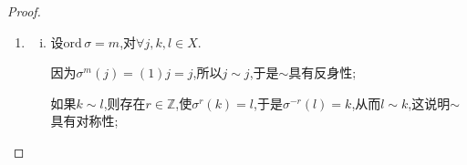 \documentclass[../../main.tex]{subfiles}%
\begin{document}
\begin{proof}
\begin{enumerate}[(1)]
若$a \neq \sigma_1$，则$\bar{F}_{\sigma_1^{-1} a} \neq \bar{F}_{\text{id}}= \varnothing$. 从而$\bar{F}_{\sigma_1^{-1} a} \neq \bar{F}_{a}$,否则由\eqref{eq:::09gjhy45he4t2fbety4swygew3tygwef23g2.5.5}式知$\bar{F}_{\sigma _1}=\varnothing $,即$\sigma_1=\text{id}$,这与$i_1,i_2,\cdots,i_{r-1}$互不相同矛盾!
再对$\sigma_1^{-1} a$用上述方法同理可得另一轮换$\sigma_2=(j_1j_2\cdots j_{l-1})$,使得
\begin{align}
\bar{F}_{\sigma _2}=\{j_1,j_2,\cdots, j_{l-1}\}\subseteq \bar{F}_{\sigma _{1}^{-1}a},\label{eq::9h2344ttf3g4w5yehbyjkym}
\end{align}
并且
\begin{align*}
\begin{cases}
\bar{F}_{\sigma _{1}^{-1}a}=\bar{F}_{\sigma _2}\cup \bar{F}_{\sigma _{2}^{-1}\sigma _{1}^{-1}a},\\
\bar{F}_{\sigma _2}\cap \bar{F}_{\sigma _{2}^{-1}\sigma _{1}^{-1}a}=\varnothing .\\
\end{cases}
\end{align*}
若$a\ne \sigma_1\sigma_2$,则同理有$\bar{F}_{\sigma_2^{-1} \sigma_1^{-1} a} \neq \bar{F}_{\sigma_1^{-1} a}$.
从而$\bar{F}_{\sigma_2^{-1} \sigma_1^{-1} a} \subset \bar{F}_{\sigma_1^{-1} a} \subset \bar{F}_a$. 由\eqref{eq:::09gjhy45he4t2fbety4swygew3tygwef23g2.5.5}式和\eqref{eq::9h2344ttf3g4w5yehbyjkym}式知$$\{i_1, i_2, \cdots, i_{r-1}\}\cap \{j_1,j_2,\cdots, j_{l-1}\}=\bar{F}_{\sigma_1}\cap \bar{F}_{\sigma _2}=\varnothing,$$
故$\sigma_1$与$\sigma_2$为不相交的轮换.
继续做下去.由于$\bar{F}_a$是有限的，最后有$s\in \mathbb{N}$,使得互不相交的轮换$\sigma_1,\sigma_2,\cdots,\sigma_s$满足
\begin{align*}
\bar{F}_{\sigma_s^{-1} \sigma_{s-1}^{-1} \cdots \sigma_1^{-1} a} = \varnothing,
\end{align*}
即$\sigma_s^{-1} \sigma_{s-1}^{-1} \cdots \sigma_1^{-1} a = \text{id}$，因而
\begin{align*}
a = \sigma_1 \sigma_2 \cdots \sigma_s,
\end{align*}
即$S_n$中任何元素可表为互不相交的轮换之积.

\item \begin{enumerate}[(i)]
\item 设$\text{ord}\,\sigma = m$,对$\forall j,k,l \in X$.

因为$\sigma^m(j) = (1)j = j$,所以$j \sim j$,于是$\sim$具有反身性;

如果$k \sim l$,则存在$r \in \mathbb{Z}$,使$\sigma^r(k) = l$,于是$\sigma^{-r}(l) = k$,从而$l \sim k$,这说明$\sim$具有对称性;


\end{enumerate}
\end{enumerate}
\end{proof}
\end{document}
